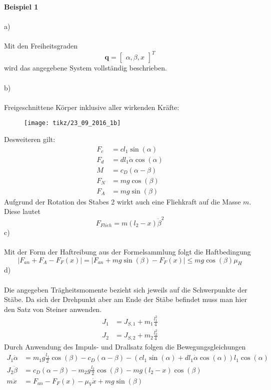 \textbf{Beispiel 1}\\ \\
a)\\ \\
Mit den Freiheitsgraden
\[
	\textbf{q} = \begin{bmatrix}
		\alpha , \beta , x
	\end{bmatrix}^T
\]
wird das angegebene System vollständig beschrieben.\\ \\
b)\\ \\
Freigeschnittene Körper inklusive aller wirkenden Kräfte:
\begin{figure}[h]
	\centering
	\texttt{[image: tikz/23\_09\_2016\_1b]}
\end{figure}
\newline
Desweiteren gilt:
\begin{align*}
	F_c &= cl_1\sin(\alpha) \\
	F_d &= dl_1\dot{\alpha}\cos(\alpha) \\
	M &= c_D (\alpha - \beta) \\
	F_N &= mg\cos(\beta) \\
	F_A &= mg\sin(\beta)
\end{align*}
Aufgrund der Rotation des Stabes 2 wirkt auch eine Fliehkraft auf die Masse $m$. Diese lautet
\[
	F_{Flieh} = m(l_2 - x)\dot{\beta}^2
\]
c)\\ \\ 
Mit der Form der Haftreibung aus der Formelsammlung folgt die Haftbedingung
\[
	|F_{an} + F_A - F_F(x)| = |F_{an} + mg\sin(\beta) - F_F(x)| \leq mg\cos(\beta)\mu_H
\]
d)\\ \\
Die angegeben Trägheitsmomente bezieht sich jeweils auf die Schwerpunkte der Stäbe. Da sich der Drehpunkt aber am Ende der Stäbe befindet muss man hier den Satz von Steiner anwenden. 
\begin{align*}
	J_1 &= J_{S,1} + m_1\frac{l_1^2}{4} \\
	J_2 &= J_{S,2} + m_2\frac{l_2^2}{4}
\end{align*}
Durch Anwendung des Impuls- und Drallsatz folgen die Bewegungsgleichungen
\begin{align*}
	J_1\ddot{\alpha} &= m_1g\frac{l_1}{2}\cos(\beta) - c_D(\alpha - \beta) - \left(cl_1\sin(\alpha) + dl_1\dot{\alpha}\cos(\alpha)\right)l_1\cos(\alpha) \\
	J_2\ddot{\beta}&= c_D(\alpha - \beta) - m_2g\frac{l_2}{2}\cos(\beta) - mg(l_2 - x)\cos(\beta) \\
	m\ddot{x} &= F_{an} - F_F(x) - \mu_V\dot{x} + mg\sin(\beta)
\end{align*}
